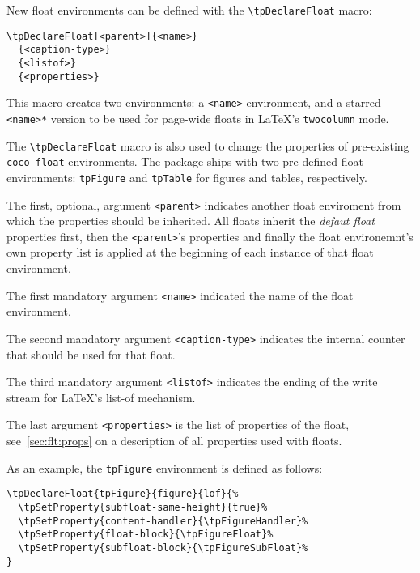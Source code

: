 New float environments can be defined with the
\lstinline{\tpDeclareFloat} macro:
\begin{lstlisting}[style=tex]
\tpDeclareFloat[<parent>]{<name>}
  {<caption-type>}
  {<listof>}
  {<properties>}
\end{lstlisting}
This macro creates two environments: a \lstinline{<name>} environment,
and a starred \lstinline{<name>*} version to be used for page-wide
floats in \LaTeX's \lstinline{twocolumn} mode.

The \lstinline{\tpDeclareFloat} macro is also used to change the
properties of pre-existing \lstinline{coco-float}
environments. The package ships with two pre-defined float
environments: \lstinline{tpFigure} and \lstinline{tpTable} for figures
and tables, respectively.

The first, optional, argument \lstinline{<parent>} indicates another
float enviroment from which the properties should be inherited. All
floats inherit the \textit{defaut float} properties first, then the
\lstinline{<parent>}'s properties and finally the float environemnt's
own property list is applied at the beginning of each instance of that
float environment.

The first mandatory argument \lstinline{<name>} indicated the name of the float
environment.

The second mandatory argument \lstinline{<caption-type>} indicates the
internal counter that should be used for that float.

The third mandatory argument \lstinline{<listof>} indicates the ending
of the write stream for \LaTeX's list-of mechanism.

The last argument \lstinline{<properties>} is the list of properties
of the float, see~\autoref{sec:flt:props} on a description of all
properties used with floats.

As an example, the \lstinline{tpFigure} environment is defined as
follows:
\begin{lstlisting}[style=tex]
\tpDeclareFloat{tpFigure}{figure}{lof}{%
  \tpSetProperty{subfloat-same-height}{true}%
  \tpSetProperty{content-handler}{\tpFigureHandler}%
  \tpSetProperty{float-block}{\tpFigureFloat}%
  \tpSetProperty{subfloat-block}{\tpFigureSubFloat}%
}
\end{lstlisting}




